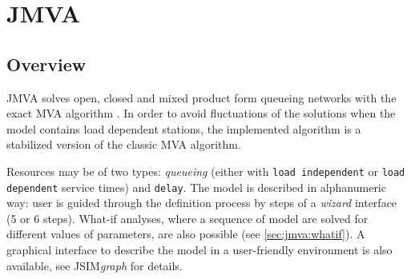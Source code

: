 %
%
%
%
%
\chapter{JMVA}
\label{cha:jmva}
\section{Overview}
JMVA solves open, closed and mixed product form \cite{BCMP} queueing
networks with the exact MVA algorithm \cite{MVA}. In order to avoid
fluctuations of the solutions when the model contains load dependent
stations, the implemented algorithm is a stabilized version
\cite{AMVA} of the classic MVA algorithm.

Resources may be of two types: \emph{queueing} (either with
\texttt{load independent} or \texttt{load dependent} service times)
and \texttt{delay}. The model is described in alphanumeric way: user
is guided through the definition process by steps of a \emph{wizard}
interface (5 or 6 steps). What-if analyses, where a sequence of model are solved for different
values of parameters, are also possible (see \autoref{sec:jmva:whatif}). A graphical interface to describe the model in a user-friendly environment is also available, see JSIM\textit{graph} for details. %

